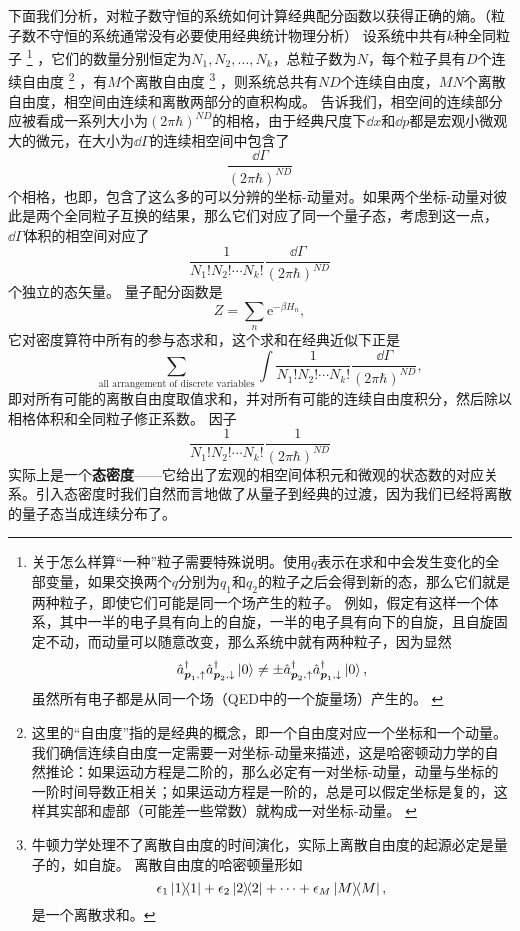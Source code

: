 \documentclass[hyperref, UTF8, a4paper]{ctexart}
\newcommand*{\ee}{\mathrm{e}}
\renewcommand{\autoref}{\prettyref}
\begin{document}
下面我们分析，对粒子数守恒的系统如何计算经典配分函数以获得正确的熵。（粒子数不守恒的系统通常没有必要使用经典统计物理分析）
设系统中共有$k$种全同粒子%
\footnote{关于怎么样算“一种”粒子需要特殊说明。使用$q$表示在求和中会发生变化的全部变量，如果交换两个$q$分别为$q_1$和$q_2$的粒子之后会得到新的态，那么它们就是两种粒子，即使它们可能是同一个场产生的粒子。
例如，假定有这样一个体系，其中一半的电子具有向上的自旋，一半的电子具有向下的自旋，且自旋固定不动，而动量可以随意改变，那么系统中就有两种粒子，因为显然
\[
    \hat{a}^\dagger_{\vb*{p}_1, \uparrow} \hat{a}^\dagger_{\vb*{p}_2, \downarrow} \ket{0} \neq \pm \hat{a}^\dagger_{\vb*{p}_2, \uparrow} \hat{a}^\dagger_{\vb*{p}_1, \downarrow} \ket{0},
\]
虽然所有电子都是从同一个场（QED中的一个旋量场）产生的。
\label{note:one-kind-of-particle}
}%
，它们的数量分别恒定为$N_1, N_2, \ldots, N_k$，总粒子数为$N$，每个粒子具有$D$个连续自由度%
\footnote{这里的“自由度”指的是经典的概念，即一个自由度对应一个坐标和一个动量。
我们确信连续自由度一定需要一对坐标-动量来描述，这是哈密顿动力学的自然推论：如果运动方程是二阶的，那么必定有一对坐标-动量，动量与坐标的一阶时间导数正相关；如果运动方程是一阶的，总是可以假定坐标是复的，这样其实部和虚部（可能差一些常数）就构成一对坐标-动量。
\label{note:degree-of-freedom}
}%
，有$M$个离散自由度
%
\footnote{牛顿力学处理不了离散自由度的时间演化，实际上离散自由度的起源必定是量子的，如自旋。
离散自由度的哈密顿量形如
\[
    \epsilon_1 \dyad{1} + \epsilon_2 \dyad{2} + \cdots + \epsilon_M \dyad{M},
\]
是一个离散求和。
}%
，则系统总共有$ND$个连续自由度，$MN$个离散自由度，相空间由连续和离散两部分的直积构成。
\autoref{sec:back-to-classical}告诉我们，相空间的连续部分应被看成一系列大小为$(2\pi \hbar)^{ND}$的相格，由于经典尺度下$\dd{x}$和$\dd{p}$都是宏观小微观大的微元，在大小为$\dd{\Gamma}$的连续相空间中包含了
\[
    \frac{\dd{\Gamma}}{(2\pi \hbar)^{ND}}
\]
个相格，也即，包含了这么多的可以分辨的坐标-动量对。如果两个坐标-动量对彼此是两个全同粒子互换的结果，那么它们对应了同一个量子态，考虑到这一点，$\dd{\Gamma}$体积的相空间对应了
\[
    \frac{1}{N_1! N_2! \cdots N_k!} \frac{\dd{\Gamma}}{(2\pi \hbar)^{ND}}
\]
个独立的态矢量。
量子配分函数是
\[
    Z = \sum_n \ee^{-\beta H_n},
\]
它对密度算符中所有的参与态求和，这个求和在经典近似下正是
\[
    \sum_\text{all arrangement of discrete variables} \int \frac{1}{N_1! N_2! \cdots N_k!} \frac{\dd{\Gamma}}{(2\pi \hbar)^{ND}},
\]
即对所有可能的离散自由度取值求和，并对所有可能的连续自由度积分，然后除以相格体积和全同粒子修正系数。
因子
\[
    \frac{1}{N_1! N_2! \cdots N_k!} \frac{1}{(2\pi \hbar)^{ND}}
\]
实际上是一个\textbf{态密度}——它给出了宏观的相空间体积元和微观的状态数的对应关系。引入态密度时我们自然而言地做了从量子到经典的过渡，因为我们已经将离散的量子态当成连续分布了。
\end{document}

